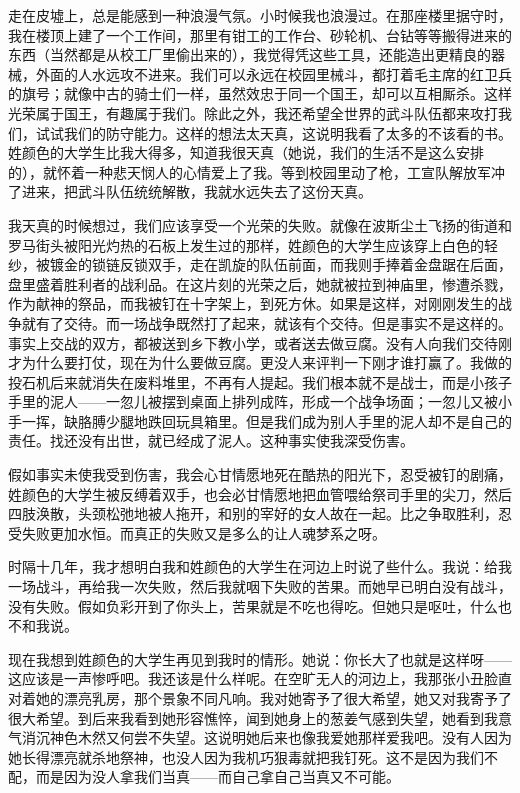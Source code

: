 走在皮墟上，总是能感到一种浪漫气氛。小时候我也浪漫过。在那座楼里据守时，我在楼顶上建了一个工作间，那里有钳工的工作台、砂轮机、台钻等等搬得进来的东西（当然都是从校工厂里偷出来的），我觉得凭这些工具，还能造出更精良的器械，外面的人水远攻不进来。我们可以永远在校园里械斗，都打着毛主席的红卫兵的旗号；就像中古的骑士们一样，虽然效忠于同一个国王，却可以互相厮杀。这样光荣属于国王，有趣属于我们。除此之外，我还希望全世界的武斗队伍都来攻打我们，试试我们的防守能力。这样的想法太天真，这说明我看了太多的不该看的书。姓颜色的大学生比我大得多，知道我很天真（她说，我们的生活不是这么安排的），就怀着一种悲天悯人的心情爱上了我。等到校园里动了枪，工宣队解放军冲了进来，把武斗队伍统统解散，我就水远失去了这份天真。 

我天真的时候想过，我们应该享受一个光荣的失败。就像在波斯尘土飞扬的街道和罗马街头被阳光灼热的石板上发生过的那样，姓颜色的大学生应该穿上白色的轻纱，被镀金的锁链反锁双手，走在凯旋的队伍前面，而我则手捧着金盘踞在后面，盘里盛着胜利者的战利品。在这片刻的光荣之后，她就被拉到神庙里，惨遭杀戮，作为献神的祭品，而我被钉在十字架上，到死方休。如果是这样，对刚刚发生的战争就有了交待。而一场战争既然打了起来，就该有个交待。但是事实不是这样的。事实上交战的双方，都被送到乡下教小学，或者送去做豆腐。没有人向我们交待刚才为什么要打仗，现在为什么要做豆腐。更没人来评判一下刚才谁打赢了。我做的投石机后来就消失在废料堆里，不再有人提起。我们根本就不是战士，而是小孩子手里的泥人——一忽儿被摆到桌面上排列成阵，形成一个战争场面；一忽儿又被小手一挥，缺胳膊少腿地跌回玩具箱里。但是我们成为别人手里的泥人却不是自己的责任。找还没有出世，就已经成了泥人。这种事实使我深受伤害。 

假如事实未使我受到伤害，我会心甘情愿地死在酷热的阳光下，忍受被钉的剧痛，姓颜色的大学生被反缚着双手，也会必甘情愿地把血管喂给祭司手里的尖刀，然后四肢涣散，头颈松弛地被人拖开，和别的宰好的女人故在一起。比之争取胜利，忍受失败更加水恒。而真正的失败又是多么的让人魂梦系之呀。 

时隔十几年，我才想明白我和姓颜色的大学生在河边上时说了些什么。我说：给我一场战斗，再给我一次失败，然后我就咽下失败的苦果。而她早已明白没有战斗，没有失败。假如负彩开到了你头上，苦果就是不吃也得吃。但她只是呕吐，什么也不和我说。 

现在我想到姓颜色的大学生再见到我时的情形。她说：你长大了也就是这样呀——这应该是一声惨呼吧。我还该是什么样呢。在空旷无人的河边上，我那张小丑脸直对着她的漂亮乳房，那个景象不同凡响。我对她寄予了很大希望，她又对我寄予了很大希望。到后来我看到她形容憔悴，闻到她身上的葱姜气感到失望，她看到我意气消沉神色木然又何尝不失望。这说明她后来也像我爱她那样爱我吧。没有人因为她长得漂亮就杀地祭神，也没人因为我机巧狠毒就把我钉死。这不是因为我们不配，而是因为没人拿我们当真——而自己拿自己当真又不可能。 

